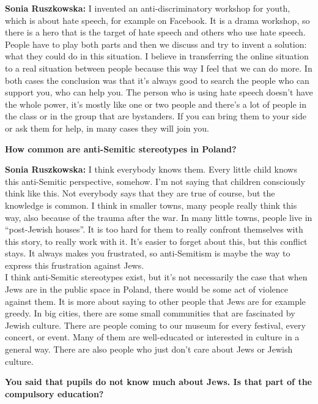 \textbf{Sonia Ruszkowska:} I invented an anti-discriminatory workshop for youth, which is about hate speech, for example on Facebook. It is a drama workshop, so there is a hero that is the target of hate speech and others who use hate speech. People have to play both parts and then we discuss and try to invent a solution: what they could do in this situation. I believe in transferring the online situation to a real situation between people because this way I feel that we can do more. In both cases the conclusion was that it’s always good to search the people who can support you, who can help you. The person who is using hate speech doesn't have the whole power, it’s mostly like one or two people and there’s a lot of people in the class or in the group that are bystanders. If you can bring them to your side or ask them for help, in many cases they will join you.  

\textbf{How common are anti-Semitic stereotypes in Poland?} 

\textbf{Sonia Ruszkowska:} I think everybody knows them. Every little child knows this anti-Semitic perspective, somehow. I’m not saying that children consciously think like this. Not everybody says that they are true of course, but the knowledge is common. I think in smaller towns, many people really think this way, also because of the trauma after the war. In many little towns, people live in ``post-Jewish houses''. It is too hard for them to really confront themselves with this story, to really work with it. It’s easier to forget about this, but this conflict stays. It always makes you frustrated, so anti-Semitism is maybe the way to express this frustration against Jews.\\
I think anti-Semitic stereotypes exist, but it’s not necessarily the case that when Jews are in the public space in Poland, there would be some act of violence against them. It is more about saying to other people that Jews are for example greedy. In big cities, there are some small communities that are fascinated by Jewish culture. There are people coming to our museum for every festival, every concert, or event. Many of them are well-educated or interested in culture in a general way. There are also people who just don’t care about Jews or Jewish culture. 

\textbf{You said that pupils do not know much about Jews. Is that part of the compulsory education?} 

